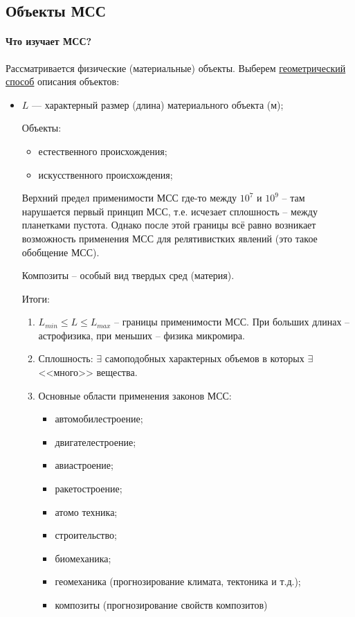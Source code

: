 \subsection{Объекты МСС}

\paragraph{Что изучает МСС?}
Рассматривается физические (материальные) объекты. Выберем \underline{геометрический способ}
описания объектов:
\begin{itemize}
  \item $L$ --- характерный размер (длина) материального объекта (м);
    
    Объекты:
    \begin{itemize}
      \item естественного происхождения;
      \item искусственного происхождения;
    \end{itemize}

    Верхний предел применимости МСС где-то между $10^7$ и $10^9$ -- там нарушается первый принцип
    МСС, т.е. исчезает сплошность -- между планетками пустота. Однако после этой границы всё равно 
    возникает возможность применения МСС для релятивистких явлений (это такое обобщение МСС).

    Композиты -- особый вид твердых сред (материя).

    Итоги:
    \begin{enumerate}
      \item $L_{min} \leqslant L \leqslant L_{max}$ -- границы применимости МСС. При больших
        длинах -- астрофизика, при меньших -- физика микромира.

      \item Сплошность: $\exists$ самоподобных характерных объемов в которых $\exists$ <<много>>
        вещества.

      \item Основные области применения законов МСС:
        \begin{itemize}
          \item автомобилестроение;
          \item двигателестроение;
          \item авиастроение;
          \item ракетостроение;
          \item атомо техника;
          \item строительство;
          \item биомеханика; %
          \item геомеханика (прогнозирование климата, тектоника и т.д.);
          \item композиты (прогнозирование свойств композитов)


\end{itemize}
\end{enumerate}
\end{itemize}
